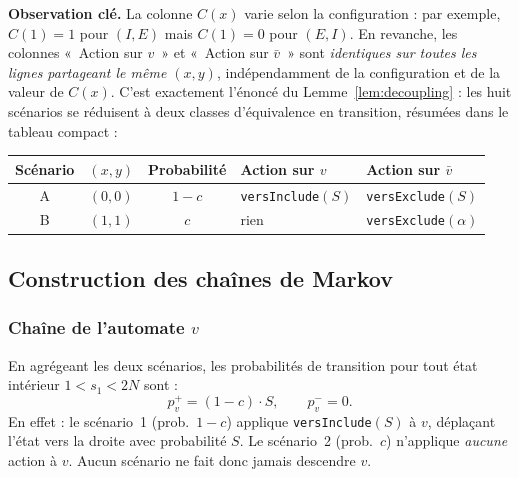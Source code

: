 \documentclass[12pt,a4paper]{article}
\theoremstyle{remark}
\newcommand{\vbar}{\bar{v}}
\begin{document}
\medskip
\noindent
\textbf{Observation clé.}  La colonne $C(x)$ varie selon la configuration :
par exemple, $C(1) = 1$ pour $(I,E)$ mais $C(1) = 0$ pour $(E,I)$.
En revanche, les colonnes «~Action sur $v$~» et «~Action sur $\vbar$~»
sont \emph{identiques sur toutes les lignes partageant le même $(x,y)$},
indépendamment de la configuration et de la valeur de $C(x)$.
C'est exactement l'énoncé du Lemme~\ref{lem:decoupling} : les huit scénarios se
réduisent à deux classes d'équivalence en transition, résumées dans le tableau compact :

\begin{center}
\begin{tabular}{cccll}
\toprule
Scénario & $(x,y)$ & Probabilité & Action sur $v$ & Action sur $\vbar$ \\
\midrule
A & $(0,0)$ & $1-c$ & \texttt{versInclude}$(S)$ & \texttt{versExclude}$(S)$ \\
B & $(1,1)$ & $c$   & rien & \texttt{versExclude}$(\alpha)$ \\
\bottomrule
\end{tabular}
\end{center}

\subsection{Construction des chaînes de Markov}

\subsubsection*{Chaîne de l'automate $v$}

En agrégeant les deux scénarios, les probabilités de transition pour tout état intérieur
$1 < s_1 < 2N$ sont :
\[
  \boxed{p^+_v = (1-c)\cdot S, \qquad p^-_v = 0.}
\]
En effet : le scénario~1 (prob.\ $1-c$) applique \texttt{versInclude}$(S)$ à $v$,
déplaçant l'état vers la droite avec probabilité $S$.  Le scénario~2 (prob.\ $c$)
n'applique \emph{aucune} action à $v$.  Aucun scénario ne fait donc jamais descendre $v$.
\end{document}
